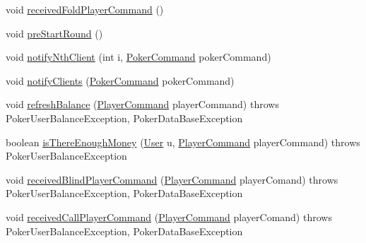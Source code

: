 \begin{DoxyCompactItemize}
\item 
void \hyperlink{classhu_1_1elte_1_1bfw1p6_1_1poker_1_1server_1_1_abstract_poker_table_server_a633e92e1981f3e0f3e5791575aead634}{received\+Fold\+Player\+Command} ()
\item 
void \hyperlink{classhu_1_1elte_1_1bfw1p6_1_1poker_1_1server_1_1_abstract_poker_table_server_a87323347a19b14af14ab5ff023834451}{pre\+Start\+Round} ()
\item 
void \hyperlink{classhu_1_1elte_1_1bfw1p6_1_1poker_1_1server_1_1_abstract_poker_table_server_a5e7aa8dfea0c2fc7e04ef7e1bac7c439}{notify\+Nth\+Client} (int i, \hyperlink{interfacehu_1_1elte_1_1bfw1p6_1_1poker_1_1command_1_1_poker_command}{Poker\+Command} poker\+Command)
\item 
void \hyperlink{classhu_1_1elte_1_1bfw1p6_1_1poker_1_1server_1_1_abstract_poker_table_server_af5200eab31232ac7cb71aca6cdda8462}{notify\+Clients} (\hyperlink{interfacehu_1_1elte_1_1bfw1p6_1_1poker_1_1command_1_1_poker_command}{Poker\+Command} poker\+Command)
\item 
void \hyperlink{classhu_1_1elte_1_1bfw1p6_1_1poker_1_1server_1_1_abstract_poker_table_server_ae3d567bb09e618a4796e2919141e8f6e}{refresh\+Balance} (\hyperlink{classhu_1_1elte_1_1bfw1p6_1_1poker_1_1command_1_1_player_command}{Player\+Command} player\+Command)  throws Poker\+User\+Balance\+Exception, Poker\+Data\+Base\+Exception 
\item 
boolean \hyperlink{classhu_1_1elte_1_1bfw1p6_1_1poker_1_1server_1_1_abstract_poker_table_server_a11c2341370be270bd7fae83031173f6a}{is\+There\+Enough\+Money} (\hyperlink{classhu_1_1elte_1_1bfw1p6_1_1poker_1_1model_1_1entity_1_1_user}{User} u, \hyperlink{classhu_1_1elte_1_1bfw1p6_1_1poker_1_1command_1_1_player_command}{Player\+Command} player\+Command)  throws Poker\+User\+Balance\+Exception 
\item 
void \hyperlink{classhu_1_1elte_1_1bfw1p6_1_1poker_1_1server_1_1_abstract_poker_table_server_acba73f6d131bd991339121390707f126}{received\+Blind\+Player\+Command} (\hyperlink{classhu_1_1elte_1_1bfw1p6_1_1poker_1_1command_1_1_player_command}{Player\+Command} player\+Comand)  throws Poker\+User\+Balance\+Exception, Poker\+Data\+Base\+Exception 
\item 
void \hyperlink{classhu_1_1elte_1_1bfw1p6_1_1poker_1_1server_1_1_abstract_poker_table_server_ae2c38b4e27d20e5e240c7dcea97ca2cc}{received\+Call\+Player\+Command} (\hyperlink{classhu_1_1elte_1_1bfw1p6_1_1poker_1_1command_1_1_player_command}{Player\+Command} player\+Comand)  throws Poker\+User\+Balance\+Exception, Poker\+Data\+Base\+Exception 

\end{DoxyCompactItemize}
